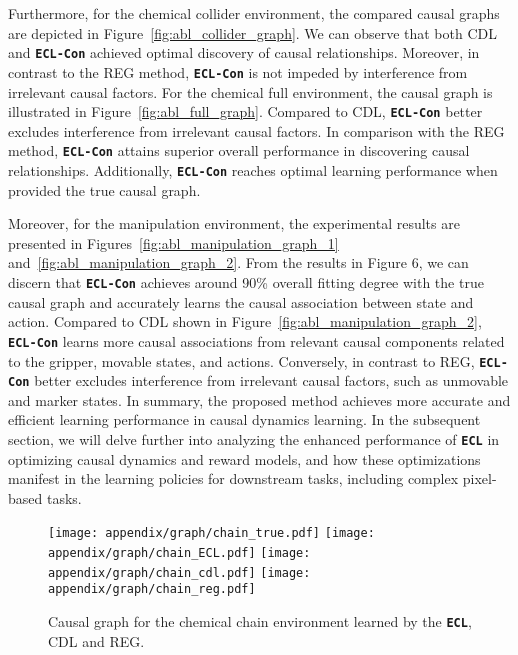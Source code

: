 Furthermore, for the chemical collider environment, the compared causal graphs are depicted in Figure~\ref{fig:abl_collider_graph}. We can observe that both CDL and \texttt{\textbf{ECL-Con}} achieved optimal discovery of causal relationships. Moreover, in contrast to the REG method, \texttt{\textbf{ECL-Con}} is not impeded by interference from irrelevant causal factors. 
For the chemical full environment, the causal graph is illustrated in Figure~\ref{fig:abl_full_graph}. Compared to CDL, \texttt{\textbf{ECL-Con}} better excludes interference from irrelevant causal factors. In comparison with the REG method, \texttt{\textbf{ECL-Con}} attains superior overall performance in discovering causal relationships. Additionally, \texttt{\textbf{ECL-Con}} reaches optimal learning performance when provided the true causal graph.

Moreover, for the manipulation environment, the experimental results are presented in Figures~\ref{fig:abl_manipulation_graph_1} and~\ref{fig:abl_manipulation_graph_2}. From the results in Figure 6, we can discern that \texttt{\textbf{ECL-Con}} achieves around 90\% overall fitting degree with the true causal graph and accurately learns the causal association between state and action. Compared to CDL shown in Figure~\ref{fig:abl_manipulation_graph_2}, \texttt{\textbf{ECL-Con}} learns more causal associations from relevant causal components related to the gripper, movable states, and actions. Conversely, in contrast to REG, \texttt{\textbf{ECL-Con}} better excludes interference from irrelevant causal factors, such as unmovable and marker states. 
In summary, the proposed method achieves more accurate and efficient learning performance in causal dynamics learning. In the subsequent section, we will delve further into analyzing the enhanced performance of \texttt{\textbf{ECL}} in optimizing causal dynamics and reward models, and how these optimizations manifest in the learning policies for downstream tasks, including complex pixel-based tasks. 


\begin{figure}[h]
    \centering
    \texttt{[image: appendix/graph/chain\_true.pdf]}
    \texttt{[image: appendix/graph/chain\_ECL.pdf]}
    \texttt{[image: appendix/graph/chain\_cdl.pdf]}
    \texttt{[image: appendix/graph/chain\_reg.pdf]}
    
    \caption{Causal graph for the chemical chain environment learned by the \texttt{\textbf{ECL}}, CDL and REG.}
    \label{fig:abl_chain_graph}
\end{figure}

